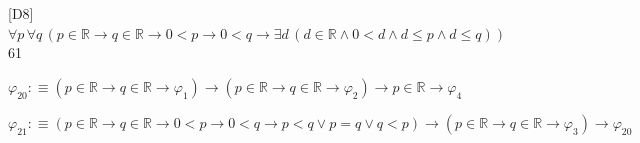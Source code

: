 \begin{fullproof}{[D8]}{$\forall p\,\forall q\,(p \in \mathbb{R} \to q \in \mathbb{R} \to 0 < p \to 0 < q \to \exists d\,(d \in \mathbb{R} \land 0 < d \land d \leq p \land d \leq q))$}{61}
\begin{abbrevlist}
\item $\varphi_{20} :\equiv (p \in \mathbb{R} \to q \in \mathbb{R} \to \varphi_{1}) \to (p \in \mathbb{R} \to q \in \mathbb{R} \to \varphi_{2}) \to p \in \mathbb{R} \to \varphi_{4}$
\item $\varphi_{21} :\equiv (p \in \mathbb{R} \to q \in \mathbb{R} \to 0 < p \to 0 < q \to p < q \lor p = q \lor q < p) \to (p \in \mathbb{R} \to q \in \mathbb{R} \to \varphi_{3}) \to \varphi_{20}$
\end{abbrevlist}
\end{fullproof}
